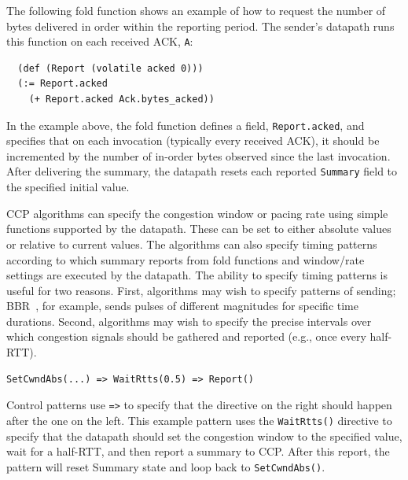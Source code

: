 The following fold function shows an example of how to request the number of bytes delivered in order within the reporting period. The sender's datapath runs this function on each received ACK, \texttt{A}:

{\footnotesize
\begin{verbatim}
  (def (Report (volatile acked 0)))
  (:= Report.acked
    (+ Report.acked Ack.bytes_acked))
\end{verbatim}
 }
 
In the example above, the fold function defines a field, \texttt{Report.acked}, and specifies that on each invocation (typically every received ACK), it should be incremented by the number of in-order bytes observed since the last invocation. After delivering the summary, the datapath resets each reported \texttt{Summary} field to the specified initial value.

 
 CCP algorithms can specify the congestion window or pacing rate using simple functions supported by the datapath. These can be set to either absolute values or relative to current values. The algorithms can also specify timing patterns according to which summary reports from fold functions and window/rate settings are executed by the datapath. 
The ability to specify timing patterns is useful for two reasons. First, algorithms may wish to specify patterns of sending; BBR~\cite{bbr}, for example, sends pulses of different magnitudes for specific time durations. Second, algorithms may wish to specify the precise intervals over which congestion signals should be gathered and reported (e.g., once every half-RTT).
 
\begin{verbatim}
SetCwndAbs(...) => WaitRtts(0.5) => Report()
\end{verbatim}
 
Control patterns use \texttt{=>} to specify that the directive on the right should happen after the one on the left. This example pattern uses the \texttt{WaitRtts()} directive to specify that the datapath should set the congestion window to the specified value, wait for a half-RTT, and then report a summary to CCP. After this report, the pattern will reset Summary state and loop back to \texttt{SetCwndAbs()}.
 
